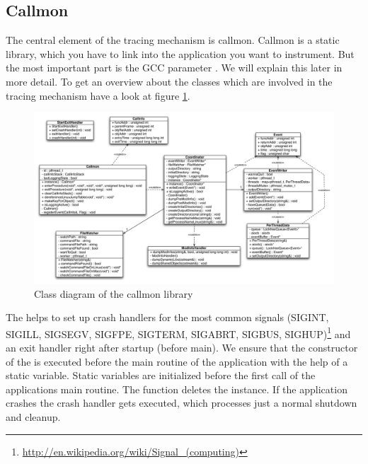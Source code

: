 \subsection{Callmon}

The central element of the tracing mechanism is callmon. Callmon is a static library, which you have to link into the application you want to instrument. But the most important part is the GCC parameter . We will explain this later in more detail. To get an overview about the classes which are involved in the tracing mechanism have a look at figure \ref{fig:UNIXfe_figure1}.

\begin{figure}[ht]
\centering
\includegraphics[width=16cm]{images/callmon_class_diagram}
\caption{Class diagram of the callmon library}\label{fig:UNIXfe_figure1}
\end{figure}

The  helps to set up crash handlers for the most common signals (SIGINT, SIGILL, SIGSEGV, SIGFPE, SIGTERM, SIGABRT, SIGBUS, SIGHUP)\footnote{\url{http://en.wikipedia.org/wiki/Signal_(computing)}} and an exit handler right after startup (before main). We ensure that the constructor of the  is executed before the main routine of the application with the help of a static variable. Static variables are initialized before the first call of the applications main routine. The  function deletes the  instance. If the application crashes the crash handler gets executed, which processes just a normal shutdown and cleanup.


